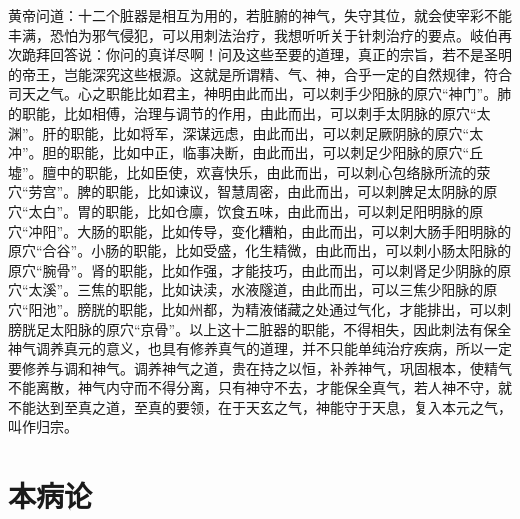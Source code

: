 \documentclass[12pt,UTF8]{ctexbook}
\begin{document}
黄帝问道：十二个脏器是相互为用的，若脏腑的神气，失守其位，就会使宰彩不能丰满，恐怕为邪气侵犯，可以用刺法治疗，我想听听关于针刺治疗的要点。岐伯再次跪拜回答说：你问的真详尽啊！问及这些至要的道理，真正的宗旨，若不是圣明的帝王，岂能深究这些根源。这就是所谓精、气、神，合乎一定的自然规律，符合司天之气。心之职能比如君主，神明由此而出，可以刺手少阳脉的原穴“神门”。肺的职能，比如相傅，治理与调节的作用，由此而出，可以刺手太阴脉的原穴“太渊”。肝的职能，比如将军，深谋远虑，由此而出，可以刺足厥阴脉的原穴“太冲”。胆的职能，比如中正，临事决断，由此而出，可以刺足少阳脉的原穴“丘墟”。膻中的职能，比如臣使，欢喜快乐，由此而出，可以刺心包络脉所流的荥穴“劳宫”。脾的职能，比如谏议，智慧周密，由此而出，可以刺脾足太阴脉的原穴“太白”。胃的职能，比如仓廪，饮食五味，由此而出，可以刺足阳明脉的原穴“冲阳”。大肠的职能，比如传导，变化糟粕，由此而出，可以刺大肠手阳明脉的原穴“合谷”。小肠的职能，比如受盛，化生精微，由此而出，可以刺小肠太阳脉的原穴“腕骨”。肾的职能，比如作强，才能技巧，由此而出，可以刺肾足少阴脉的原穴“太溪”。三焦的职能，比如诀渎，水液隧道，由此而出，可以三焦少阳脉的原穴“阳池”。膀胱的职能，比如州都，为精液储藏之处通过气化，才能排出，可以刺膀胱足太阳脉的原穴“京骨”。以上这十二脏器的职能，不得相失，因此刺法有保全神气调养真元的意义，也具有修养真气的道理，并不只能单纯治疗疾病，所以一定要修养与调和神气。调养神气之道，贵在持之以恒，补养神气，巩固根本，使精气不能离散，神气内守而不得分离，只有神守不去，才能保全真气，若人神不守，就不能达到至真之道，至真的要领，在于天玄之气，神能守于天息，复入本元之气，叫作归宗。

\chapter{本病论}
\end{document}
